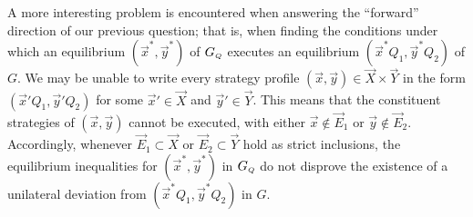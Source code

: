     A more interesting problem is encountered when answering the ``forward'' direction of our previous question; that is, when finding the conditions under which an equilibrium $(\vec{x}^*, \vec{y}^*)$ of $G_\ms{Q}$ executes an equilibrium $(\vec{x}^* Q_1, \vec{y}^* Q_2)$ of $G$.
    We may be unable to write every strategy profile $(\vec{x}, \vec{y}) \in \vec{X} \times \vec{Y}$ in the form $(\vec{x}' Q_1, \vec{y}' Q_2)$ for some $\vec{x}' \in \vec{X}$ and $\vec{y}' \in \vec{Y}$.
    This means that the constituent strategies of $(\vec{x}, \vec{y})$ cannot be executed, with either $\vec{x} \notin \vec{E}_1$ or $\vec{y} \notin \vec{E}_2$.
    Accordingly, whenever $\vec{E}_1 \subset \vec{X}$ or $\vec{E}_2 \subset \vec{Y}$ hold as strict inclusions, the equilibrium inequalities for $(\vec{x}^*, \vec{y}^*)$ in $G_\ms{Q}$ do not disprove the existence of a unilateral deviation from $(\vec{x}^* Q_1, \vec{y}^* Q_2)$ in $G$.

